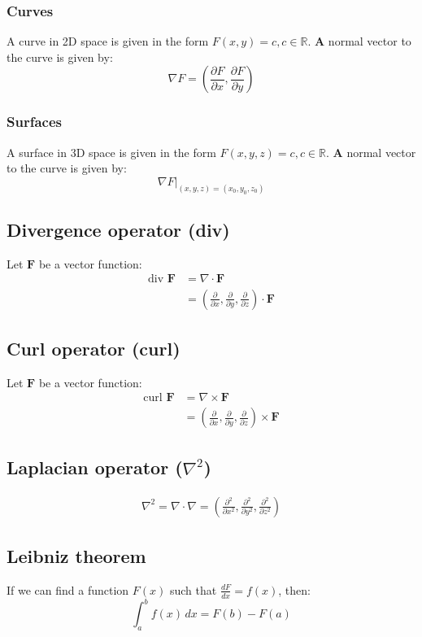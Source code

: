 \documentclass[11pt]{article}
\begin{document}
\subsubsection{Curves}
\label{sec:orga8c0910}
A curve in 2D space is given in the form \(F(x, y) = c, c \in \mathbb{R}\). \textbf{A} normal vector to the curve is given by:
\[\nabla F = \left(\frac{\partial F}{\partial x}, \frac{\partial F}{\partial y} \right)\]
\subsubsection{Surfaces}
\label{sec:org99e332b}
A surface in 3D space is given in the form \(F(x, y, z) = c, c \in \mathbb{R}\). \textbf{A} normal vector to the curve is given by:
\[\left. \nabla F \right|_{(x, y, z) = (x_0, y_0, z_0)}\]
\subsection{Divergence operator (div)}
\label{sec:orga53a093}
Let \(\boldsymbol{F}\) be a vector function:
\begin{align*}
\text{div } \boldsymbol{F} &= \nabla \cdot \boldsymbol{F} \\
&= \left(\frac{\partial}{\partial x}, \frac{\partial}{\partial y}, \frac{\partial}{\partial z} \right) \cdot \boldsymbol{F}
\end{align*}
\subsection{Curl operator (curl)}
\label{sec:org454ead4}
Let \(\boldsymbol{F}\) be a vector function:
\begin{align*}
\text{curl } \boldsymbol{F} &= \nabla \times \boldsymbol{F} \\
&= \left(\frac{\partial}{\partial x}, \frac{\partial}{\partial y}, \frac{\partial}{\partial z} \right) \times \boldsymbol{F}
\end{align*}
\subsection{Laplacian operator (\(\nabla^2\))}
\label{sec:org6502b9d}
\begin{align*}
\nabla^2 = \nabla \cdot \nabla = \left(\frac{\partial^2}{\partial x^2}, \frac{\partial^2}{\partial y^2}, \frac{\partial^2}{\partial z^2}\right)
\end{align*}
\subsection{Leibniz theorem}
\label{sec:orgf086b3e}
\label{orgbcda0a5}
If we can find a function \(F(x)\) such that \(\frac{dF}{dx} = f(x)\), then:
\[\int_a^b f (x) \, dx = F(b) - F(a)\]
\end{document}
